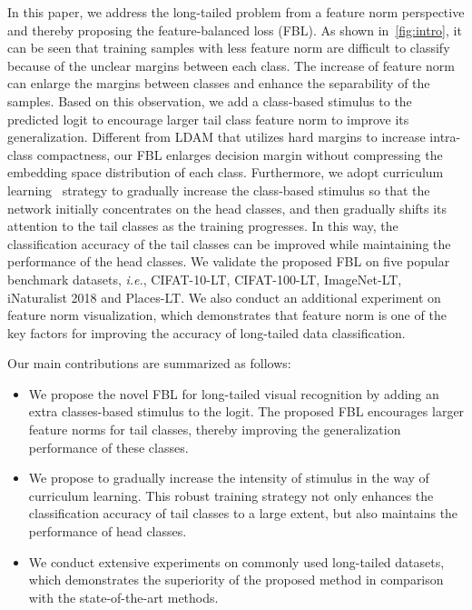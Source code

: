 \documentclass{article}
\def\ie{\emph{i.e.}} \def\Ie{\emph{I.e}\onedot}
\begin{document}
In this paper, we address the long-tailed problem from a feature norm perspective and thereby proposing the feature-balanced loss (FBL). As shown in~\cref{fig:intro}, it can be seen that training samples with less feature norm are difficult to classify because of the unclear margins between each class. The increase of feature norm can enlarge the margins between classes and enhance the separability of the samples. Based on this observation, we add a class-based stimulus to the predicted logit to encourage larger tail class feature norm to improve its generalization. Different from LDAM that utilizes hard margins to increase intra-class compactness, our FBL enlarges decision margin without compressing the embedding space distribution of each class. Furthermore, we adopt curriculum learning~\cite{bengio2009curriculum} strategy to gradually increase the class-based stimulus so that the network initially concentrates on the head classes, and then gradually shifts its attention to the tail classes as the training progresses. In this way, the classification accuracy of the tail classes can be improved while maintaining the performance of the head classes. We validate the proposed FBL on five popular benchmark datasets, \ie, CIFAT-10-LT, CIFAT-100-LT, ImageNet-LT, iNaturalist 2018 and Places-LT. We also conduct an additional experiment on feature norm visualization, which demonstrates that feature norm is one of the key factors for improving the accuracy of long-tailed data classification.

Our main contributions are summarized as follows:
\begin{itemize}[leftmargin=*]
    \item We propose the novel FBL for long-tailed visual recognition by adding an extra classes-based stimulus to the logit. The proposed FBL encourages larger feature norms for tail classes, thereby improving the generalization performance of these classes.
    \item We propose to gradually increase the intensity of stimulus in the way of curriculum learning. This robust training strategy not only enhances the classification accuracy of tail classes to a large extent, but also maintains the performance of head classes.
    \item We conduct extensive experiments on commonly used long-tailed datasets, which demonstrates the superiority of the proposed method in comparison with the state-of-the-art methods.
\end{itemize}
\end{document}

